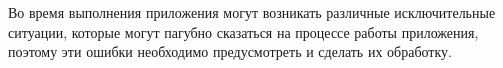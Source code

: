 Во время выполнения приложения могут возникать различные исключительные ситуации, которые могут пагубно сказаться на процессе работы приложения, поэтому эти ошибки необходимо предусмотреть и сделать их обработку.
